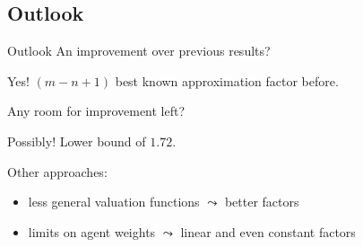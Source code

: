 \subsection{Outlook}
\begin{frame}{Outlook}
	An improvement over previous results?

	Yes!
	\((m-n+1)\) best known approximation factor before.

	\medskip

	Any room for improvement left?

	Possibly!
	Lower bound of \(1.72\).

	\bigskip

	Other approaches:
	\begin{itemize}
		\item
		less general valuation functions \(\leadsto\) better factors

		\item
		limits on agent weights \(\leadsto\) linear and even constant factors
	\end{itemize}
\end{frame}





\begin{frame}
	\renewcommand{\insertsectionnumber}{!}
	\renewcommand{\insertsection}{End of Talk}
	\sectionpage
\end{frame}
